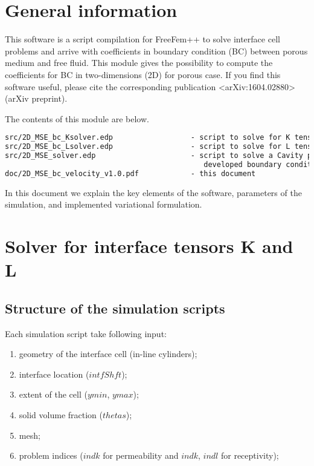 \documentclass[12pt,a4paper]{article}
\begin{document}
\sloppy

\section{General information}

This software is a script compilation for FreeFem++ to solve interface cell problems and arrive with coefficients in boundary condition (BC) between porous medium and free fluid. This module gives the possibility to compute the coefficients for BC in two-dimensions (2D) for porous case. If you find this software useful, please cite the corresponding publication <arXiv:1604.02880> (arXiv preprint).

The contents of this module are below.
\begin{lstlisting}[language=tex]
src/2D_MSE_bc_Ksolver.edp                  - script to solve for K tensor
src/2D_MSE_bc_Lsolver.edp                  - script to solve for L tensor
src/2D_MSE_solver.edp                      - script to solve a Cavity problem with
                                              developed boundary conditions
doc/2D_MSE_bc_velocity_v1.0.pdf            - this document
\end{lstlisting}

In this document we explain the key elements of the software, parameters of the simulation, and implemented variational formulation.

\section{Solver for interface tensors K and L}

\subsection{Structure of the simulation scripts}

Each simulation script take following input:
\begin{enumerate}
    \item geometry of the interface cell (in-line cylinders);
	\item interface location ($intfShft$);
    \item extent of the cell ($ymin$, $ymax$);
    \item solid volume fraction ($thetas$);
    \item mesh;
    \item problem indices ($indk$ for permeability and $indk$, $indl$ for receptivity);
\end{enumerate}
\end{document}

